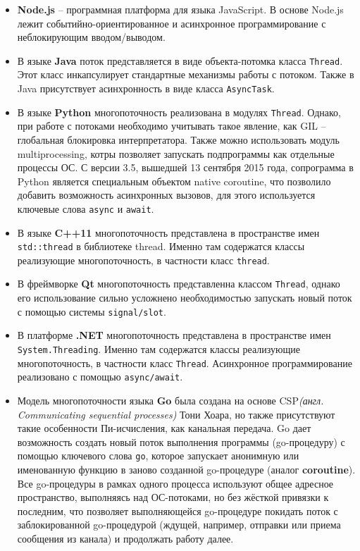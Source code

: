 \documentclass[a4paper]{article}
\begin{document}
			\begin{itemize}
				\item  \textbf{Node.js} -- программная платформа для языка JavaScript. В основе Node.js лежит событийно-ориентированное и асинхронное программирование с неблокирующим вводом/выводом.
				\item В языке \textbf{Java} поток представляется в виде объекта-потомка класса \texttt{Thread}. Этот класс инкапсулирует стандартные механизмы работы с потоком. Также в Java присутствует асинхронность в виде класса \texttt{AsyncTask}.
				\item В языке \textbf{Python} многопоточность реализована в модулях \texttt{Thread}. Однако, при работе с потоками необходимо учитывать такое явление, как GIL -- глобальная блокировка интерпретатора. Также можно использовать модуль {multiprocessing}, котры позволяет запускать подпрограммы как отдельные процессы ОС. С версии 3.5, вышедшей 13 сентября 2015 года, сопрограмма в Python является специальным объектом native coroutine, что позволило добавить возможность асинхронных вызовов, для этого используется ключевые слова \texttt{async} и \texttt{await}.
				\item В языке \textbf{C++11} многопоточность представлена в пространстве имен \texttt{std::thread} в библиотеке thread. Именно там содержатся классы реализующие многопоточность, в частности класс \texttt{thread}.
				\item В фреймворке \textbf{Qt} многопоточность представленна классом \texttt{Thread}, однако его использование сильно усложнено необходимостью запускать новый поток с помощью системы \texttt{signal/slot}.
				\item В платформе \textbf{.NET} многопоточность представлена в пространстве имен \texttt{System.Threading}. Именно там содержатся классы реализующие многопоточность, в частности класс \texttt{Thread}. Асинхронное программирование реализовано с помощью \texttt{async/await}.		
				\item Модель многопоточности языка \textbf{Go} была создана на основе CSP\emph{(англ. Communicating sequential processes)} Тони Хоара, но также присутствуют такие особенности Пи-исчисления, как канальная передача. Go дает возможность создать новый поток выполнения программы (go-процедуру) с помощью ключевого слова \texttt{go}, которое запускает анонимную или именованную функцию в заново созданной go-процедуре (аналог \textbf{coroutine}). Все go-процедуры в рамках одного процесса используют общее адресное пространство, выполняясь над ОС-потоками, но без жёсткой привязки к последним, что позволяет выполняющейся go-процедуре покидать поток с заблокированной go-процедурой (ждущей, например, отправки или приема сообщения из канала) и продолжать работу далее.

\end{itemize}
\end{document}
